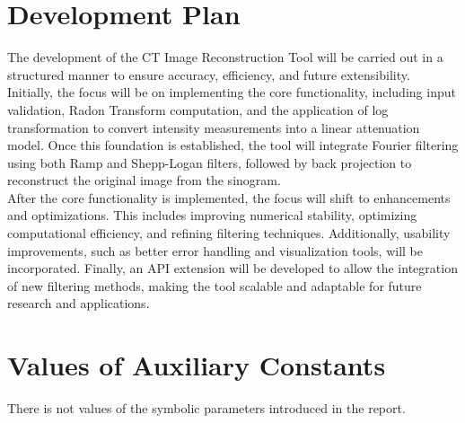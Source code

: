\documentclass[12pt]{article}
\begin{document}
\section{Development Plan}
The development of the CT Image Reconstruction Tool will be carried out in a
structured manner to ensure accuracy, efficiency, and future extensibility.
Initially, the focus will be on implementing the core functionality, including
input validation, Radon Transform computation, and the application of log
transformation to convert intensity measurements into a linear attenuation
model. Once this foundation is established, the tool will integrate Fourier
filtering using both Ramp and Shepp-Logan filters, followed by back projection
to reconstruct the original image from the sinogram.\\

After the core functionality is implemented, the focus will shift to
enhancements and optimizations. This includes improving numerical stability,
optimizing computational efficiency, and refining filtering techniques.
Additionally, usability improvements, such as better error handling and
visualization tools, will be incorporated. Finally, an API extension will be
developed to allow the integration of new filtering methods, making the tool
scalable and adaptable for future research and applications.

\section{Values of Auxiliary Constants}
There is not values of the symbolic parameters introduced in the report.

\newpage
\printbibliography
\end{document}
